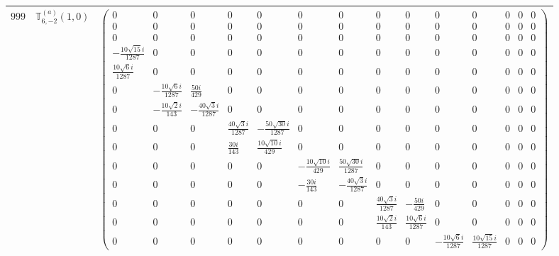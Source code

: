 \documentclass[fleqn,8pt,landscape]{jsarticle}
\begin{document}
\begin{center}
\begin{longtable}{ccc}
$ 999 $ & $ \mathbb{T}_{6,-2}^{(a)}(1,0) $ & $ \begin{pmatrix} 0 & 0 & 0 & 0 & 0 & 0 & 0 & 0 & 0 & 0 & 0 & 0 & 0 & 0 \\ 0 & 0 & 0 & 0 & 0 & 0 & 0 & 0 & 0 & 0 & 0 & 0 & 0 & 0 \\ 0 & 0 & 0 & 0 & 0 & 0 & 0 & 0 & 0 & 0 & 0 & 0 & 0 & 0 \\ - \frac{10 \sqrt{15} i}{1287} & 0 & 0 & 0 & 0 & 0 & 0 & 0 & 0 & 0 & 0 & 0 & 0 & 0 \\ \frac{10 \sqrt{6} i}{1287} & 0 & 0 & 0 & 0 & 0 & 0 & 0 & 0 & 0 & 0 & 0 & 0 & 0 \\ 0 & - \frac{10 \sqrt{6} i}{1287} & \frac{50 i}{429} & 0 & 0 & 0 & 0 & 0 & 0 & 0 & 0 & 0 & 0 & 0 \\ 0 & - \frac{10 \sqrt{2} i}{143} & - \frac{40 \sqrt{3} i}{1287} & 0 & 0 & 0 & 0 & 0 & 0 & 0 & 0 & 0 & 0 & 0 \\ 0 & 0 & 0 & \frac{40 \sqrt{3} i}{1287} & - \frac{50 \sqrt{30} i}{1287} & 0 & 0 & 0 & 0 & 0 & 0 & 0 & 0 & 0 \\ 0 & 0 & 0 & \frac{30 i}{143} & \frac{10 \sqrt{10} i}{429} & 0 & 0 & 0 & 0 & 0 & 0 & 0 & 0 & 0 \\ 0 & 0 & 0 & 0 & 0 & - \frac{10 \sqrt{10} i}{429} & \frac{50 \sqrt{30} i}{1287} & 0 & 0 & 0 & 0 & 0 & 0 & 0 \\ 0 & 0 & 0 & 0 & 0 & - \frac{30 i}{143} & - \frac{40 \sqrt{3} i}{1287} & 0 & 0 & 0 & 0 & 0 & 0 & 0 \\ 0 & 0 & 0 & 0 & 0 & 0 & 0 & \frac{40 \sqrt{3} i}{1287} & - \frac{50 i}{429} & 0 & 0 & 0 & 0 & 0 \\ 0 & 0 & 0 & 0 & 0 & 0 & 0 & \frac{10 \sqrt{2} i}{143} & \frac{10 \sqrt{6} i}{1287} & 0 & 0 & 0 & 0 & 0 \\ 0 & 0 & 0 & 0 & 0 & 0 & 0 & 0 & 0 & - \frac{10 \sqrt{6} i}{1287} & \frac{10 \sqrt{15} i}{1287} & 0 & 0 & 0 \end{pmatrix} $ \\ \hline

\end{longtable}
\end{center}
\end{document}
